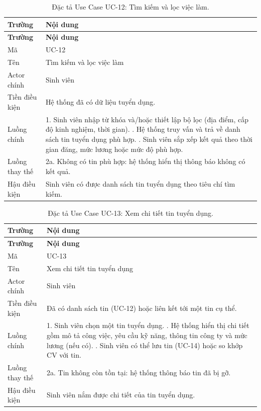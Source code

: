 \begin{longtable}{|L{3.5cm}|L{10cm}|}
\caption{Đặc tả Use Case UC-12: Tìm kiếm và lọc việc làm.}
\label{tab:uc12} \\
\hline
\textbf{Trường} & \textbf{Nội dung} \\
\hline
\endfirsthead
\hline
\textbf{Trường} & \textbf{Nội dung} \\
\hline
\endhead
Mã & UC-12 \\
\hline
Tên & Tìm kiếm và lọc việc làm \\
\hline
Actor chính & Sinh viên \\
\hline
Tiền điều kiện & Hệ thống đã có dữ liệu tuyển dụng. \\
\hline
Luồng chính & 1. Sinh viên nhập từ khóa và/hoặc thiết lập bộ lọc (địa điểm, cấp độ kinh nghiệm, thời gian). . Hệ thống truy vấn và trả về danh sách tin tuyển dụng phù hợp. . Sinh viên sắp xếp kết quả theo thời gian đăng, mức lương hoặc mức độ phù hợp. \\
\hline
Luồng thay thế & 2a. Không có tin phù hợp: hệ thống hiển thị thông báo không có kết quả. \\
\hline
Hậu điều kiện & Sinh viên có được danh sách tin tuyển dụng theo tiêu chí tìm kiếm. \\
\hline
\end{longtable}

\begin{longtable}{|L{3.5cm}|L{10cm}|}
\caption{Đặc tả Use Case UC-13: Xem chi tiết tin tuyển dụng.}
\label{tab:uc13} \\
\hline
\textbf{Trường} & \textbf{Nội dung} \\
\hline
\endfirsthead
\hline
\textbf{Trường} & \textbf{Nội dung} \\
\hline
\endhead
Mã & UC-13 \\
\hline
Tên & Xem chi tiết tin tuyển dụng \\
\hline
Actor chính & Sinh viên \\
\hline
Tiền điều kiện & Đã có danh sách tin (UC-12) hoặc liên kết tới một tin cụ thể. \\
\hline
Luồng chính & 1. Sinh viên chọn một tin tuyển dụng. . Hệ thống hiển thị chi tiết gồm mô tả công việc, yêu cầu kỹ năng, thông tin công ty và mức lương (nếu có). . Sinh viên có thể lưu tin (UC-14) hoặc so khớp CV với tin. \\
\hline
Luồng thay thế & 2a. Tin không còn tồn tại: hệ thống thông báo tin đã bị gỡ. \\
\hline
Hậu điều kiện & Sinh viên nắm được chi tiết của tin tuyển dụng. \\
\hline
\end{longtable}

